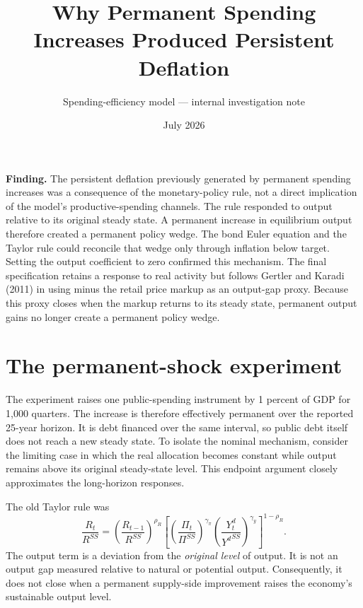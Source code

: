 \documentclass[10pt]{article}
\title{Why Permanent Spending Increases Produced Persistent Deflation}
\author{Spending-efficiency model --- internal investigation note}
\date{July 2026}
\newcommand{\ssval}[1]{{#1}^{SS}}
\begin{document}
\maketitle

\noindent
\textbf{Finding.}
The persistent deflation previously generated by permanent spending increases was a
consequence of the monetary-policy rule, not a direct implication of the model's
productive-spending channels.
The rule responded to output relative to its original steady state.
A permanent increase in equilibrium output therefore created a permanent policy wedge.
The bond Euler equation and the Taylor rule could reconcile that wedge only through
inflation below target.
Setting the output coefficient to zero confirmed this mechanism.
The final specification retains a response to real activity but follows Gertler and
Karadi (2011) in using minus the retail price markup as an output-gap proxy.
Because this proxy closes when the markup returns to its steady state, permanent output
gains no longer create a permanent policy wedge.

\section{The permanent-shock experiment}

The experiment raises one public-spending instrument by 1 percent of GDP for 1,000
quarters.
The increase is therefore effectively permanent over the reported 25-year horizon.
It is debt financed over the same interval, so public debt itself does not reach a new
steady state.
To isolate the nominal mechanism, consider the limiting case in which the real
allocation becomes constant while output remains above its original steady-state level.
This endpoint argument closely approximates the long-horizon responses.

The old Taylor rule was
\begin{equation}\label{eq:taylor-old}
    \frac{R_t}{\ssval{R}}
    =
    \left(\frac{R_{t-1}}{\ssval{R}}\right)^{\rho_R}
    \left[
        \left(\frac{\Pi_t}{\ssval{\Pi}}\right)^{\gamma_\pi}
        \left(\frac{Y_t^d}{\ssval{Y^d}}\right)^{\gamma_y}
    \right]^{1-\rho_R}.
\end{equation}
The output term is a deviation from the \emph{original level} of output.
It is not an output gap measured relative to natural or potential output.
Consequently, it does not close when a permanent supply-side improvement raises the
economy's sustainable output level.
\end{document}
